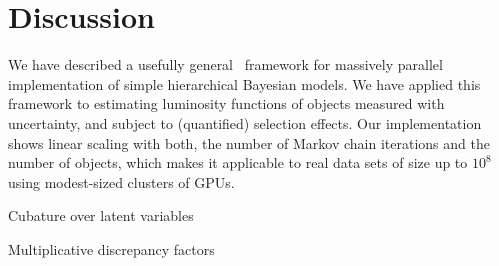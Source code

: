 \section{Discussion}
\label{sec:discussion}

We have described a usefully general \Cpp\ framework for massively parallel implementation of simple hierarchical Bayesian models.
We have applied this framework to estimating luminosity functions of objects measured with uncertainty, and subject to (quantified) selection effects.
Our implementation shows linear scaling with both, the number of Markov chain iterations and the number of objects, which makes it applicable to real data sets of size up to $10^{8}$ using modest-sized clusters of GPUs.

Cubature over latent variables

Multiplicative discrepancy factors